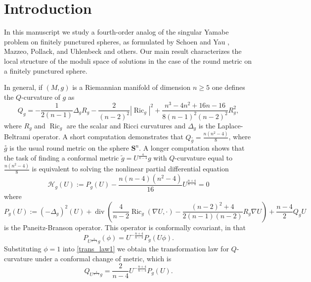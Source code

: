 \documentclass[reqno,11pt]{amsart}
\theoremstyle{tttheorem}
\newcommand{\Ss}{\mathbf{S}}
\DeclareMathOperator{\Ric}{Ric}
\begin{document}
\section{Introduction} 

In this manuscript we study a fourth-order analog of the singular 
Yamabe problem on finitely punctured spheres, as formulated by Schoen and 
Yau \cite{SY}, Mazzeo, Pollack, and Uhlenbeck \cite{MPU} and others. Our main 
result characterizes the local structure of the moduli space 
of solutions in the case of the round metric on a finitely 
punctured sphere. 

In general, if $(M,g)$ is a Riemannian manifold of dimension 
$n \geq 5$ one defines the $Q$-curvature of $g$ as 
\begin{equation} \label{q_defn}
Q_g = -\frac{1}{2(n-1)} \Delta_g R_g - \frac{2}{(n-2)^2} |\Ric_g|^2 
+ \frac{n^3-4n^2 +16n-16}{8(n-1)^2(n-2)^2} R_g^2,
\end{equation}
where $R_g$ and $\Ric_g$ are the scalar and Ricci curvatures and 
$\Delta_g$ is the Laplace-Beltrami operator. A short computation 
demonstrates that $\displaystyle Q_{\overset{\circ}{g}} = \frac{n(n^2-4)}{8}$, 
where $\overset{\circ}{g}$ is the usual round metric on the sphere 
$\Ss^n$. A longer computation shows that the task of finding a 
conformal metric $\widetilde g = U^{\frac{4}{n-4}} g$ with $Q$-curvature 
equal to $\displaystyle \frac{n(n^2-4)}{8}$ is 
equivalent to solving the nonlinear partial differential 
equation 
\begin{equation} \label{const_q_general}
 \mathcal{H}_g (U) := P_g(U) - \frac{n(n-4)(n^2-4)}{16} 
U^{\frac{n+4}{n-4}}=0
\end{equation} 
where
\begin{equation} \label{paneitz_op_general} 
P_g(U) := (-\Delta_g)^2(U) + \operatorname{div} \left ( \frac{4}{n-2} 
\Ric_g (\nabla U, \cdot )- \frac{(n-2)^2 + 4}{2(n-1)(n-2)} R_g \nabla U\right )
+ \frac{n-4}{2} Q_g U
\end{equation} 
is the Paneitz-Branson operator. This operator is conformally covariant, 
in that 
\begin{equation} \label{trans_law1} 
P_{U^{\frac{4}{n-4}} g} (\phi) 
= U^{-\frac{n+4}{n-4}} P_g (U\phi).
\end{equation} 
Substituting $\phi=1$ into \eqref{trans_law1} we obtain the transformation 
law for $Q$-curvature under a conformal change of metric, which is 
\begin{equation} \label{trans_law2} 
Q_{U^{\frac{4}{n-4}} g} 
= \frac{2}{n-4} U^{-\frac{n+4}{n-4}} P_g(U). 
\end{equation} 
\end{document}
